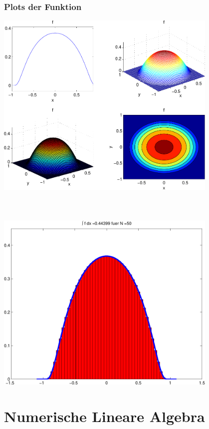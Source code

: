 \documentclass[hyperref={xetex}]{beamer}
\begin{document}
\begin{frame}[fragile]\frametitle{Plots der Funktion}
\begin{center}
\includegraphics[width=0.8\textwidth]{./figures/plot_f}  
\end{center}
\end{frame}

% 
% 
\begin{frame}[fragile]\frametitle{}
\centering\alert{ }\\
\begin{center}
\includegraphics[width=0.8\textwidth]{./figures/plot_sobolev} 
\end{center}
\end{frame}



\section{Numerische Lineare Algebra}
\end{document}
